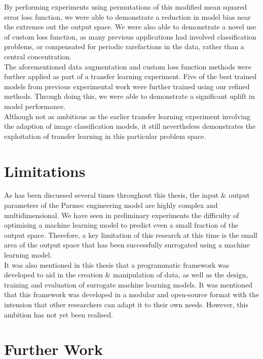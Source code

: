 \noindent
By performing experiments using permutations of this modified mean squared error loss function, we were able to demonstrate a reduction in model bias near the extremes out the output space. We were also able to demonstrate a novel use of custom loss function, as many previous applications had involved classification problems, or compensated for periodic rarefactions in the data, rather than a central concentration. \\

\noindent
The aforementioned data augmentation and custom loss function methods were further applied as part of a transfer learning experiment. Five of the best trained models from previous experimental work were further trained using our refined methods. Through doing this, we were able to demonstrate a significant uplift in model performance. \\

\noindent
Although not as ambitious as the earlier transfer learning experiment involving the adaption of image classification models, it still nevertheless demonstrates the exploitation of transfer learning in this particular problem space. 
 
 \section{Limitations}
 
 As has been discussed several times throughout this thesis, the input \& output parameters of the Parmec engineering model are highly complex and multidimensional. We have seen in preliminary experiments the difficulty of optimising a machine learning model to predict even a small fraction of the output space. Therefore, a key limitation of this research at this time is the small area of the output space that has been successfully surrogated using a machine learning model. \\
 
 \noindent
 It was also mentioned in this thesis that a programmatic framework was developed to aid in the creation \& manipulation of data, as well as the design, training and evaluation of surrogate machine learning models. It was mentioned that this framework was developed in a modular and open-source  format with the intension that other researchers can adapt it to their own needs. However, this ambition has not yet been realised.

\section{Further Work}

